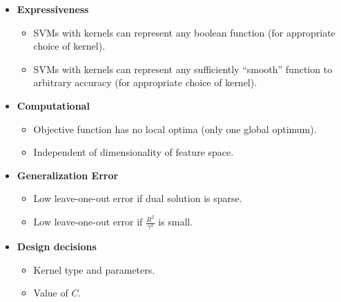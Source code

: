 \begin{itemize}
    \item \textbf{Expressiveness}
    \begin{itemize}
        \item SVMs with kernels can represent any boolean function (for appropriate choice of kernel).
        \item SVMs with kernels can represent any sufficiently ``smooth'' function to arbitrary accuracy (for appropriate choice of kernel).
    \end{itemize}
    \item \textbf{Computational}
    \begin{itemize}
        \item Objective function has no local optima (only one global optimum).
        \item Independent of dimensionality of feature space.
    \end{itemize}
    \item \textbf{Generalization Error}
    \begin{itemize}
        \item Low leave-one-out error if dual solution is sparse.
        \item Low leave-one-out error if $\frac{R^2}{\gamma^2}$ is small.
    \end{itemize}
    \item \textbf{Design decisions}
    \begin{itemize}
        \item Kernel type and parameters.
        \item Value of $C$.
    \end{itemize}
\end{itemize}